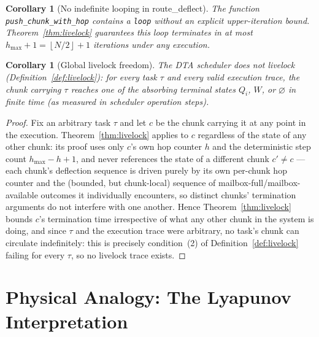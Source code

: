 \documentclass[11pt,a4paper]{report}
\newtheorem{corollary}[theorem]{Corollary}
\newcommand{\floor}[1]{\left\lfloor #1 \right\rfloor}
\newcommand{\code}[1]{\texttt{#1}}
\begin{document}
\begin{corollary}[No indefinite looping in route\_deflect]
\label{cor:nodeflectloop}
The function \code{push\_chunk\_with\_hop} contains a \code{loop}
without an explicit upper-iteration bound.  Theorem~\ref{thm:livelock}
guarantees this loop terminates in at most
$h_{\max} + 1 = \floor{N/2} + 1$ iterations under any execution.
\end{corollary}

\begin{corollary}[Global livelock freedom]
\label{cor:global}
The DTA scheduler does not livelock (Definition~\ref{def:livelock}):
for every task $\tau$ and every valid execution trace, the chunk
carrying $\tau$ reaches one of the absorbing terminal states $Q_i$,
$W$, or $\varnothing$ in finite time (as measured in scheduler
operation steps).
\end{corollary}

\begin{proof}
Fix an arbitrary task $\tau$ and let $c$ be the chunk carrying it at
any point in the execution. Theorem~\ref{thm:livelock} applies to $c$
regardless of the state of any other chunk: its proof uses only $c$'s
own hop counter $h$ and the deterministic step count $h_{\max}-h+1$,
and never references the state of a different chunk $c' \neq c$ ---
each chunk's deflection sequence is driven purely by its own
per-chunk hop counter and the (bounded, but chunk-local) sequence of
mailbox-full/mailbox-available outcomes it individually encounters, so
distinct chunks' termination arguments do not interfere with one
another. Hence Theorem~\ref{thm:livelock} bounds $c$'s termination time
irrespective of what any other chunk in the system is doing, and since
$\tau$ and the execution trace were arbitrary, no task's chunk can
circulate indefinitely: this is precisely condition~(2) of
Definition~\ref{def:livelock} failing for every $\tau$, so no livelock
trace exists.
\end{proof}

\section{Physical Analogy: The Lyapunov Interpretation}
\end{document}
